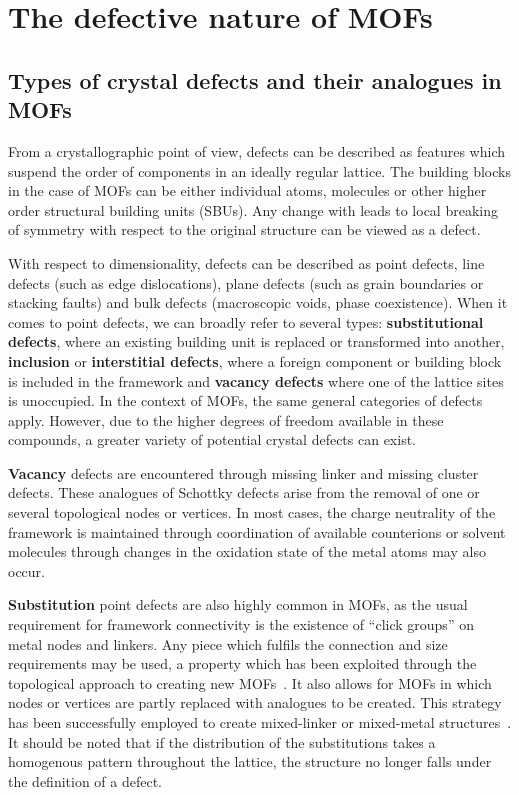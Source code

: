 
\section{The defective nature of MOFs}

\subsection{Types of crystal defects and their analogues in MOFs}

From a crystallographic point of view, defects can be described
as features which suspend the order of components in an ideally
regular lattice. The building blocks in the case of MOFs can be either
individual atoms, molecules or other higher order structural building
units (SBUs). Any change with leads to local breaking of symmetry with
respect to the original structure can be viewed as a defect.

With respect to dimensionality, defects can be described
as point defects, line defects (such as edge dislocations),
plane defects (such as grain boundaries or stacking faults) and bulk
defects (macroscopic voids, phase coexistence).
When it comes to point defects, we can broadly refer to several types:
\textbf{substitutional defects}, where an existing building unit is
replaced or transformed into another, \textbf{inclusion} or
\textbf{interstitial defects}, where a foreign component
or building block is included in the framework and \textbf{vacancy defects}
where one of the lattice sites is unoccupied.
In the context of MOFs, the same general categories of defects
apply. However, due to the higher degrees of freedom available in
these compounds, a greater variety of potential crystal defects
can exist.

\textbf{Vacancy} defects are encountered through missing linker and
missing cluster defects. These analogues of Schottky defects
arise from the removal of one or several topological nodes or vertices.
In most cases, the charge neutrality of the framework
is maintained through coordination of available counterions or solvent
molecules through changes in the oxidation state of the metal atoms
may also occur.

\textbf{Substitution} point defects are also highly common in MOFs, as the
usual requirement for framework connectivity is the existence
of ``click groups'' on metal nodes and linkers. Any
piece which fulfils the connection and size requirements may
be used, a property which has been exploited through the topological
approach to creating new 
MOFs~\cite{burnettRecentAdvancesPorphyrinic2012,%
    liTopologicalAnalysisMetal2014,%
    stockSynthesisMetalOrganicFrameworks2012}.
It also allows for MOFs in which nodes or vertices are partly
replaced with analogues to be created. This strategy has been
successfully employed to create mixed-linker or mixed-metal 
structures~\cite{buekenTacklingDefectConundrum2017,%
	dhakshinamoorthyMixedmetalMixedlinkerMetal2016}.
It should be noted that if the distribution of the substitutions takes
a homogenous pattern throughout the lattice, the structure no
longer falls under the definition of a defect.

